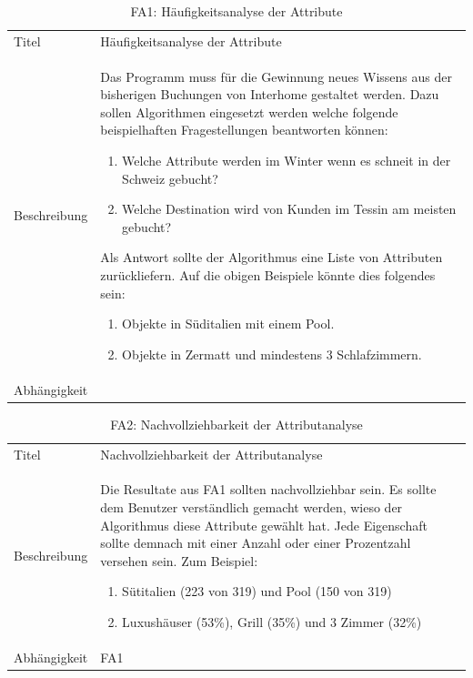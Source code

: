 \begin{table}[H] 
	\caption{FA1: Häufigkeitsanalyse der Attribute}
	\centering
	\label{fig:anforderungsanalyse:funktionaleanforderung:fa1}
	\begin{tabular}{ | l | L{10cm} | } 
		\hline 
		 \\ \hline 
		Titel & Häufigkeitsanalyse der Attribute \\ \hline 
		Beschreibung & Das Programm muss für die Gewinnung neues Wissens aus der bisherigen Buchungen von Interhome gestaltet werden. Dazu sollen Algorithmen eingesetzt werden welche folgende beispielhaften Fragestellungen beantworten können:
		\begin{enumerate}
		\item Welche Attribute werden im Winter wenn es schneit in der Schweiz gebucht?
		\item Welche Destination wird von Kunden im Tessin am meisten gebucht?
		\end{enumerate}
		
		Als Antwort sollte der Algorithmus eine Liste von Attributen zurückliefern. Auf die obigen Beispiele könnte dies folgendes sein: 
		\begin{enumerate}
		\item Objekte in Süditalien mit einem Pool.
		\item Objekte in Zermatt und mindestens 3 Schlafzimmern.
		\end{enumerate} \\ \hline 
		Abhängigkeit & \\ \hline 
	\end{tabular}
\end{table}

\begin{table}[H] 
	\caption{FA2: Nachvollziehbarkeit der Attributanalyse}
	\centering
	\label{fig:anforderungsanalyse:funktionaleanforderung:fa2}
	\begin{tabular}{ | l | L{10cm} | } 
		\hline 
		 \\ \hline 
		Titel & Nachvollziehbarkeit der Attributanalyse \\ \hline 
		Beschreibung & Die Resultate aus FA1 sollten nachvollziehbar sein. Es sollte dem Benutzer verständlich gemacht werden, wieso der Algorithmus diese Attribute gewählt hat. Jede Eigenschaft sollte demnach mit einer Anzahl oder einer Prozentzahl versehen sein. Zum Beispiel:
			\begin{enumerate}
			\item Sütitalien (223 von 319) und Pool (150 von 319)
			\item Luxushäuser (53\%), Grill (35\%) und 3 Zimmer (32\%)
			\end{enumerate} \\ \hline 
		Abhängigkeit & FA1 \\ \hline 
	\end{tabular}
\end{table}

